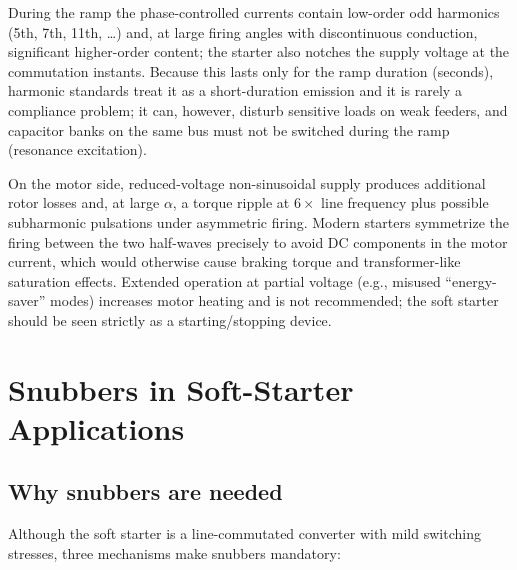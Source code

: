 During the ramp the phase-controlled currents contain low-order odd
harmonics (5th, 7th, 11th, \dots) and, at large firing angles with
discontinuous conduction, significant higher-order content; the starter also
notches the supply voltage at the commutation instants. Because this lasts
only for the ramp duration (seconds), harmonic standards treat it as a
short-duration emission and it is rarely a compliance problem; it can,
however, disturb sensitive loads on weak feeders, and capacitor banks on the
same bus must not be switched during the ramp (resonance excitation).

On the motor side, reduced-voltage non-sinusoidal supply produces additional
rotor losses and, at large $\alpha$, a torque ripple at $6\times$ line
frequency plus possible subharmonic pulsations under asymmetric firing.
Modern starters symmetrize the firing between the two half-waves precisely
to avoid DC components in the motor current, which would otherwise cause
braking torque and transformer-like saturation effects. Extended operation
at partial voltage (e.g., misused ``energy-saver'' modes) increases motor
heating and is not recommended; the soft starter should be seen strictly as
a starting/stopping device.

\section{Snubbers in Soft-Starter Applications}
\label{softstart:sec:snubbers}

\subsection{Why snubbers are needed}

Although the soft starter is a line-commutated converter with mild switching
stresses, three mechanisms make snubbers mandatory:

